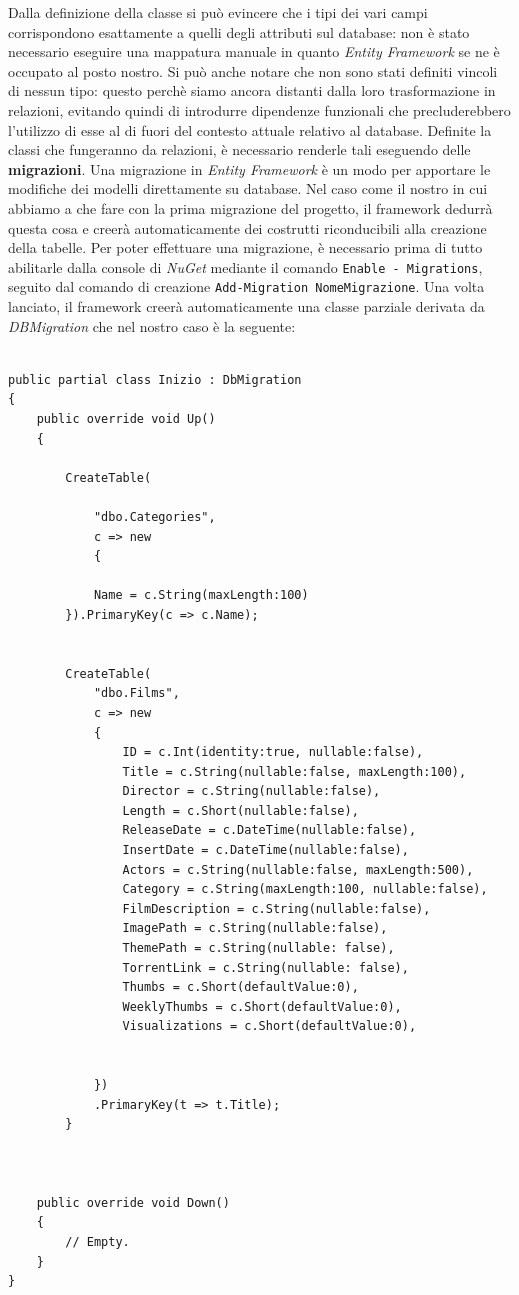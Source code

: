\documentclass[a4]{book}
\begin{document}
Dalla definizione della classe si può evincere che i tipi dei vari campi corrispondono esattamente a quelli degli attributi sul database: non è stato necessario eseguire una mappatura manuale in quanto \textit{Entity Framework} se ne è occupato al posto nostro. Si può anche notare che non sono stati definiti vincoli di nessun tipo: questo perchè siamo ancora distanti dalla loro trasformazione in relazioni, evitando quindi di introdurre dipendenze funzionali che precluderebbero l'utilizzo di esse al di fuori del contesto attuale relativo al database. \newline
Definite la classi che fungeranno da relazioni, è necessario renderle tali eseguendo delle \textbf{migrazioni}. Una migrazione in \textit{Entity Framework} è un modo per apportare le modifiche dei modelli direttamente su database. Nel caso come il nostro in cui abbiamo a che fare con la prima migrazione del progetto, il framework dedurrà questa cosa e creerà automaticamente dei costrutti riconducibili alla creazione della tabelle. Per poter effettuare una migrazione, è necessario prima di tutto abilitarle dalla console di \textit{NuGet} mediante il comando \texttt{Enable - Migrations}, seguito dal comando di creazione \texttt{Add-Migration NomeMigrazione}. Una volta lanciato, il framework creerà automaticamente una classe parziale derivata da \textit{DBMigration} che nel nostro caso è la seguente:

\begin{lstlisting}
	
public partial class Inizio : DbMigration
{
	public override void Up()
	{
		
		CreateTable(
		
			"dbo.Categories",
			c => new
			{
			
			Name = c.String(maxLength:100)
		}).PrimaryKey(c => c.Name);
		
		
		CreateTable(
			"dbo.Films",
			c => new
			{
				ID = c.Int(identity:true, nullable:false),
				Title = c.String(nullable:false, maxLength:100),
				Director = c.String(nullable:false),
				Length = c.Short(nullable:false),
				ReleaseDate = c.DateTime(nullable:false),
				InsertDate = c.DateTime(nullable:false),
				Actors = c.String(nullable:false, maxLength:500),
				Category = c.String(maxLength:100, nullable:false),
				FilmDescription = c.String(nullable:false),
				ImagePath = c.String(nullable:false),
				ThemePath = c.String(nullable: false),
				TorrentLink = c.String(nullable: false),
				Thumbs = c.Short(defaultValue:0),
				WeeklyThumbs = c.Short(defaultValue:0),
				Visualizations = c.Short(defaultValue:0),
			
			
			})
			.PrimaryKey(t => t.Title);
		}
	
	
	
	public override void Down()
	{
		// Empty.
	}
}
\end{lstlisting}
\end{document}
